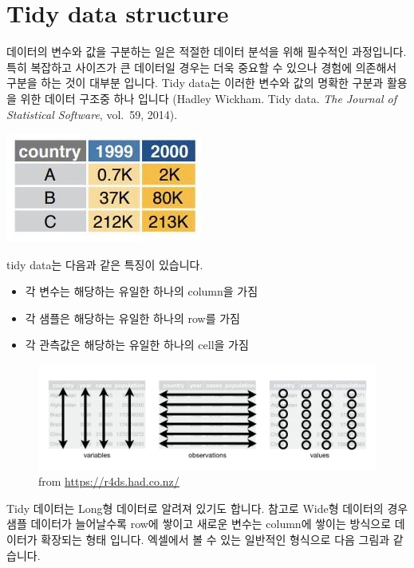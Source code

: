 \documentclass[
]{book}
\providecommand{\tightlist}{%
  \setlength{\itemsep}{0pt}\setlength{\parskip}{0pt}}
\begin{document}
\hypertarget{tidy-data-structure}{%
\section{Tidy data structure}\label{tidy-data-structure}}

데이터의 변수와 값을 구분하는 일은 적절한 데이터 분석을 위해 필수적인 과정입니다. 특히 복잡하고 사이즈가 큰 데이터일 경우는 더욱 중요할 수 있으나 경험에 의존해서 구분을 하는 것이 대부분 입니다. Tidy data는 이러한 변수와 값의 명확한 구분과 활용을 위한 데이터 구조중 하나 입니다 (Hadley Wickham. Tidy data. \emph{The Journal of Statistical Software}, vol.~59, 2014).

\includegraphics{images/07/notidy.JPG}

tidy data는 다음과 같은 특징이 있습니다.

\begin{itemize}
\tightlist
\item
  각 변수는 해당하는 유일한 하나의 column을 가짐
\item
  각 샘플은 해당하는 유일한 하나의 row를 가짐
\item
  각 관측값은 해당하는 유일한 하나의 cell을 가짐
\end{itemize}

\begin{figure}
\centering
\includegraphics[width=6.25in,height=\textheight]{images/07/tidy-1.png}
\caption{from \url{https://r4ds.had.co.nz/}}
\end{figure}

Tidy 데이터는 Long형 데이터로 알려져 있기도 합니다. 참고로 Wide형 데이터의 경우 샘플 데이터가 늘어날수록 row에 쌓이고 새로운 변수는 column에 쌓이는 방식으로 데이터가 확장되는 형태 입니다. 엑셀에서 볼 수 있는 일반적인 형식으로 다음 그림과 같습니다.
\end{document}
